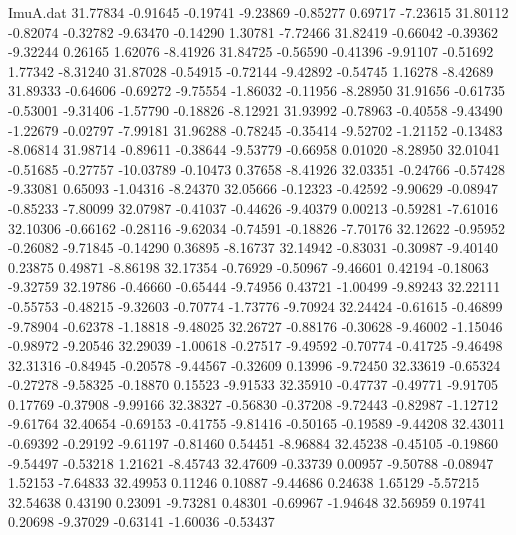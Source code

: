 \begin{filecontents}{ImuA.dat}
  31.77834   -0.91645   -0.19741   -9.23869   -0.85277    0.69717   -7.23615
  31.80112   -0.82074   -0.32782   -9.63470   -0.14290    1.30781   -7.72466
  31.82419   -0.66042   -0.39362   -9.32244    0.26165    1.62076   -8.41926
  31.84725   -0.56590   -0.41396   -9.91107   -0.51692    1.77342   -8.31240
  31.87028   -0.54915   -0.72144   -9.42892   -0.54745    1.16278   -8.42689
  31.89333   -0.64606   -0.69272   -9.75554   -1.86032   -0.11956   -8.28950
  31.91656   -0.61735   -0.53001   -9.31406   -1.57790   -0.18826   -8.12921
  31.93992   -0.78963   -0.40558   -9.43490   -1.22679   -0.02797   -7.99181
  31.96288   -0.78245   -0.35414   -9.52702   -1.21152   -0.13483   -8.06814
  31.98714   -0.89611   -0.38644   -9.53779   -0.66958    0.01020   -8.28950
  32.01041   -0.51685   -0.27757  -10.03789   -0.10473    0.37658   -8.41926
  32.03351   -0.24766   -0.57428   -9.33081    0.65093   -1.04316   -8.24370
  32.05666   -0.12323   -0.42592   -9.90629   -0.08947   -0.85233   -7.80099
  32.07987   -0.41037   -0.44626   -9.40379    0.00213   -0.59281   -7.61016
  32.10306   -0.66162   -0.28116   -9.62034   -0.74591   -0.18826   -7.70176
  32.12622   -0.95952   -0.26082   -9.71845   -0.14290    0.36895   -8.16737
  32.14942   -0.83031   -0.30987   -9.40140    0.23875    0.49871   -8.86198
  32.17354   -0.76929   -0.50967   -9.46601    0.42194   -0.18063   -9.32759
  32.19786   -0.46660   -0.65444   -9.74956    0.43721   -1.00499   -9.89243
  32.22111   -0.55753   -0.48215   -9.32603   -0.70774   -1.73776   -9.70924
  32.24424   -0.61615   -0.46899   -9.78904   -0.62378   -1.18818   -9.48025
  32.26727   -0.88176   -0.30628   -9.46002   -1.15046   -0.98972   -9.20546
  32.29039   -1.00618   -0.27517   -9.49592   -0.70774   -0.41725   -9.46498
  32.31316   -0.84945   -0.20578   -9.44567   -0.32609    0.13996   -9.72450
  32.33619   -0.65324   -0.27278   -9.58325   -0.18870    0.15523   -9.91533
  32.35910   -0.47737   -0.49771   -9.91705    0.17769   -0.37908   -9.99166
  32.38327   -0.56830   -0.37208   -9.72443   -0.82987   -1.12712   -9.61764
  32.40654   -0.69153   -0.41755   -9.81416   -0.50165   -0.19589   -9.44208
  32.43011   -0.69392   -0.29192   -9.61197   -0.81460    0.54451   -8.96884
  32.45238   -0.45105   -0.19860   -9.54497   -0.53218    1.21621   -8.45743
  32.47609   -0.33739    0.00957   -9.50788   -0.08947    1.52153   -7.64833
  32.49953    0.11246    0.10887   -9.44686    0.24638    1.65129   -5.57215
  32.54638    0.43190    0.23091   -9.73281    0.48301   -0.69967   -1.94648
  32.56959    0.19741    0.20698   -9.37029   -0.63141   -1.60036   -0.53437

\end{filecontents}
